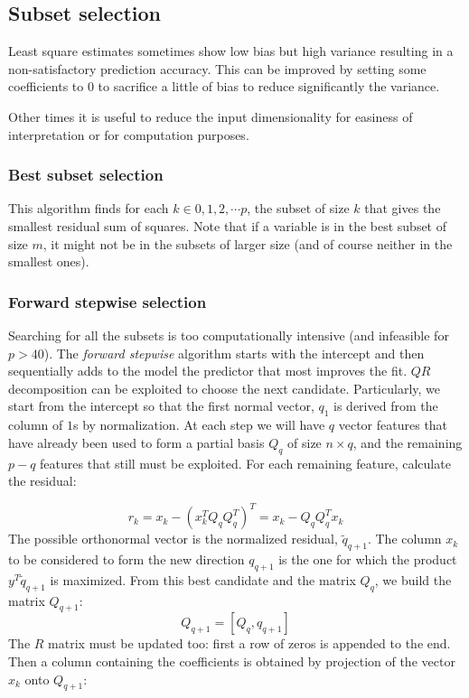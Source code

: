 \documentclass[12pt, letterpaper]{article}
\theoremstyle{definition}
\begin{document}
\subsection{Subset selection}
Least square estimates sometimes show low bias but high variance resulting in a non-satisfactory prediction accuracy. This can be improved by setting some coefficients to $0$ to sacrifice a little of bias to reduce significantly the variance.

Other times it is useful to reduce the input dimensionality for easiness of interpretation or for computation purposes.

\subsubsection{Best subset selection}
This algorithm finds for each $k \in {0,1,2,	\cdots p}$, the subset of size $k$ that gives the smallest residual sum of squares. Note that if a variable is in the best subset of size $m$, it might not be in the subsets of larger size (and of course neither in the smallest ones).

\subsubsection{Forward stepwise selection}
Searching for all the subsets is too computationally intensive (and infeasible for $p>40$). The \textit{forward stepwise} algorithm starts with the intercept and then sequentially adds to the model the predictor that most improves the fit. $QR$ decomposition can be exploited to choose the next candidate. Particularly, we start from the intercept so that the first normal vector, $q_1$ is derived from the column of $1$s by normalization. At each step we will have $q$ vector features that have already been used to form a partial basis $Q_q$ of size $n\times q$, and the remaining $p-q$ features that still must be exploited. For each remaining feature, calculate the residual:

\begin{equation}
r_k  = x_k - \left(x_k^T Q_qQ_q^T\right)^T = x_k - Q_qQ_q^Tx_k
\end{equation}
The possible orthonormal vector is the normalized residual, $\tilde{q}_{q+1}$. The column $x_k$ to be considered to form the new direction $q_{q+1}$ is the one for which the product $y^T \tilde{q}_{q+1}$ is maximized. From this best candidate and the matrix $Q_{q}$, we build the matrix $Q_{q+1}$:
\begin{equation}
Q_{q+1} = \left[Q_{q}, q_{q+1}\right]
\end{equation}
The $R$ matrix must be updated too: first a row of zeros is appended to the end. Then a column containing the coefficients is obtained by projection of the vector $x_k$ onto $Q_{q+1}$:
\end{document}
